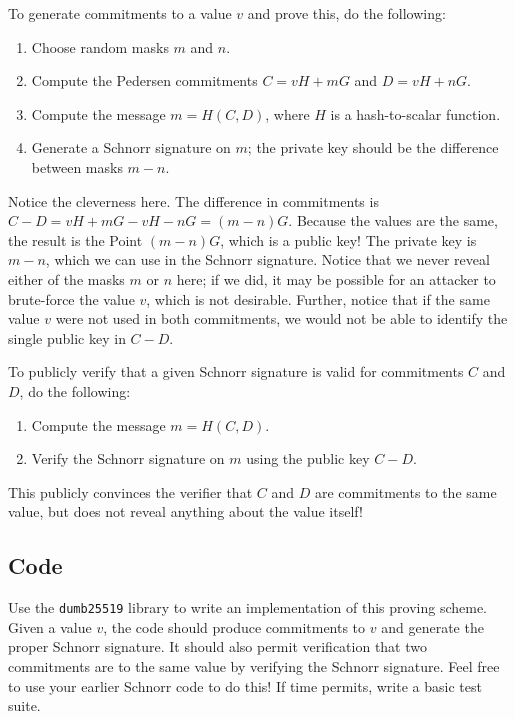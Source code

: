 \documentclass{article}
\begin{document}
To generate commitments to a value $v$ and prove this, do the following:
\begin{enumerate}
\item Choose random masks $m$ and $n$.
\item Compute the Pedersen commitments $C = vH + mG$ and $D = vH + nG$.
\item Compute the message $m = H(C,D)$, where $H$ is a hash-to-scalar function.
\item Generate a Schnorr signature on $m$; the private key should be the difference between masks $m-n$.
\end{enumerate}
Notice the cleverness here. The difference in commitments is $C-D = vH + mG - vH - nG = (m-n)G$. Because the values are the same, the result is the Point $(m-n)G$, which is a public key! The private key is $m-n$, which we can use in the Schnorr signature. Notice that we never reveal either of the masks $m$ or $n$ here; if we did, it may be possible for an attacker to brute-force the value $v$, which is not desirable. Further, notice that if the same value $v$ were not used in both commitments, we would not be able to identify the single public key in $C-D$.

To publicly verify that a given Schnorr signature is valid for commitments $C$ and $D$, do the following:
\begin{enumerate}
\item Compute the message $m = H(C,D)$.
\item Verify the Schnorr signature on $m$ using the public key $C-D$.
\end{enumerate}
This publicly convinces the verifier that $C$ and $D$ are commitments to the same value, but does not reveal anything about the value itself!

\subsection{Code}
Use the \texttt{dumb25519} library to write an implementation of this proving scheme. Given a value $v$, the code should produce commitments to $v$ and generate the proper Schnorr signature. It should also permit verification that two commitments are to the same value by verifying the Schnorr signature. Feel free to use your earlier Schnorr code to do this! If time permits, write a basic test suite.
\end{document}
